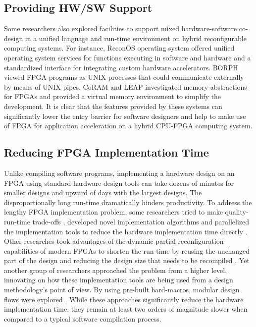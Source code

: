 \subsection{Providing HW/SW Support}
Some researchers also explored facilities to support mixed hardware-software co-design in a unified language and run-time environment \cite{so2008unified, lubbers2009ReconOS, fleming2014leap, chung2011coram, andrews2008achieving, agron2009domain} on hybrid reconfigurable computing systems. For instance, ReconOS operating system \cite{lubbers2009ReconOS} offered unified operating system services for functions executing in software and hardware and a standardized interface for integrating custom hardware accelerators. BORPH \cite{so2008unified} viewed FPGA programs as UNIX processes that could communicate externally by means of UNIX pipes. CoRAM and LEAP \cite{chung2011coram, fleming2014leap} investigated memory abstractions for FPGAs and provided a virtual memory environment to simplify the development. It is clear that the features provided by these systems can significantly lower the entry barrier for software designers and help to make use of FPGA for application acceleration on a hybrid CPU-FPGA computing system. 

\subsection{Reducing FPGA Implementation Time}
Unlike compiling software programs, implementing a hardware design on an FPGA using standard hardware design tools can take dozens of minutes for smaller designs and upward of days with the largest designs. The disproportionally long run-time dramatically hinders productivity. To address the lengthy FPGA implementation problem, some researchers tried to make quality-run-time trade-offs \cite{mulpuri2001runtime, sankar1999trading}, developed novel implementation algorithms \cite{wrighton2003hardware, tessier2002fast, maidee2003fast} and parallelized the implementation tools to reduce the hardware implementation time directly \cite{moctar2014parallel, goeders2011deterministic, altera-pc, xilinx-pc}. Other researches took advantages of the dynamic partial reconfiguration capabilities of modern FPGAs to shorten the run-time by reusing the unchanged part of the design and reducing the design size that needs to be recompiled \cite{frangieh2010PATIS, kao2005benefits, horta2002dynamic, beckhoff2012go}. Yet another group of researchers approached the problem from a higher level, innovating on how these implementation tools are being used from a design methodology's point of view. By using pre-built hard-macros, modular design flows were explored \cite{lavin2013improving, korf2011automatic, lavin2011HMFlow, lavin2013impact}. While these approaches significantly reduce the hardware implementation time, they remain at least two orders of magnitude slower when compared to a typical software compilation process.


